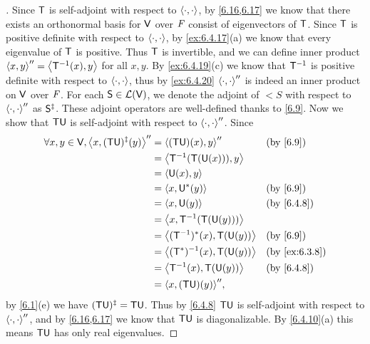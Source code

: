 \begin{proof}[]
	Since \(\mathsf{T}\) is self-adjoint with respect to \(\left\langle\cdot, \cdot\right\rangle\), by \cref{6.16,6.17} we know that there exists an orthonormal basis for \(\mathsf{V}\) over \(\mathit{F}\) consist of eigenvectors of \(\mathsf{T}\).
	Since \(\mathsf{T}\) is positive definite with respect to \(\left\langle\cdot, \cdot\right\rangle\), by \cref{ex:6.4.17}(a) we know that every eigenvalue of \(\mathsf{T}\) is positive.
	Thus \(\mathsf{T}\) is invertible, and we can define inner product \(\left\langle x, y\right\rangle'' = \left\langle\mathsf{T}^{-1}(x), y\right\rangle\) for all \(x, y\).
	By \cref{ex:6.4.19}(c) we know that \(\mathsf{T}^{-1}\) is positive definite with respect to \(\left\langle\cdot, \cdot\right\rangle\), thus by \cref{ex:6.4.20} \(\left\langle\cdot, \cdot\right\rangle''\) is indeed an inner product on \(\mathsf{V}\) over \(\mathit{F}\).
	For each \(\mathsf{S} \in \mathcal{L}(\mathsf{V})\), we denote the adjoint of \(\lt{S}\) with respect to \(\left\langle\cdot, \cdot\right\rangle''\) as \(\mathsf{S}^{\ddag}\).
	These adjoint operators are well-defined thanks to \cref{6.9}.
	Now we show that \(\mathsf{T} \mathsf{U}\) is self-adjoint with respect to \(\left\langle\cdot, \cdot\right\rangle''\).
	Since
	\begin{align*}
		\forall x, y \in \V, \inn{x, (\T \U)^{\ddag}(y)}'' & = \inn{(\T \U)(x), y}''           &  & \by{6.9}      \\
		                                                   & = \inn{\T^{-1}(\T(\U(x))), y}                        \\
		                                                   & = \inn{\U(x), y}                                     \\
		                                                   & = \inn{x, \U^*(y)}                &  & \by{6.9}      \\
		                                                   & = \inn{x, \U(y)}                  &  & \by{6.4.8}    \\
		                                                   & = \inn{x, \T^{-1}(\T(\U(y)))}                        \\
		                                                   & = \inn{(\T^{-1})^*(x), \T(\U(y))} &  & \by{6.9}      \\
		                                                   & = \inn{(\T^*)^{-1}(x), \T(\U(y))} &  & \by{ex:6.3.8} \\
		                                                   & = \inn{\T^{-1}(x), \T(\U(y))}     &  & \by{6.4.8}    \\
		                                                   & = \inn{x, (\T \U)(y)}'',
	\end{align*}
	by \cref{6.1}(e) we have \((\mathsf{T} \mathsf{U})^{\ddag} = \mathsf{T} \mathsf{U}\).
	Thus by \cref{6.4.8} \(\mathsf{T} \mathsf{U}\) is self-adjoint with respect to \(\left\langle\cdot, \cdot\right\rangle''\), and by \cref{6.16,6.17} we know that \(\mathsf{T} \mathsf{U}\) is diagonalizable.
	By \cref{6.4.10}(a) this means \(\mathsf{T} \mathsf{U}\) has only real eigenvalues.
\end{proof}

